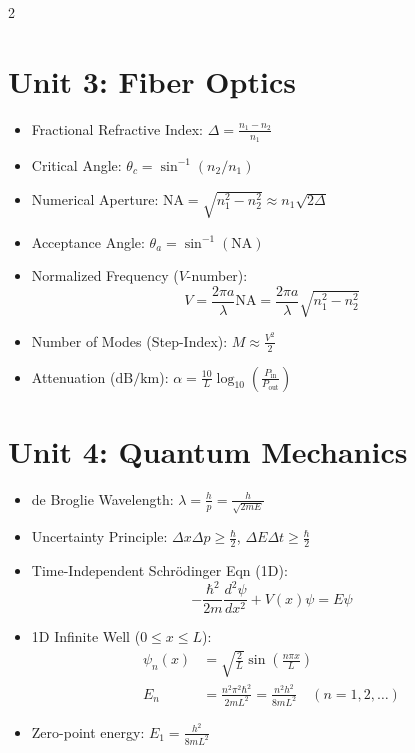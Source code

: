 \begin{multicols}{2}
{\columnbreak

\section*{Unit 3: Fiber Optics}
\begin{itemize}[leftmargin=*]
    \item Fractional Refractive Index: $\Delta = \frac{n_1 - n_2}{n_1}$
    \item Critical Angle: $\theta_c = \sin^{-1}(n_2 / n_1)$
    \item Numerical Aperture: $\text{NA} = \sqrt{n_1^2 - n_2^2} \approx n_1 \sqrt{2\Delta}$
    \item Acceptance Angle: $\theta_a = \sin^{-1}(\text{NA})$
    \item Normalized Frequency ($V$-number):
    \[
    V = \frac{2\pi a}{\lambda}\text{NA} = \frac{2\pi a}{\lambda}\sqrt{n_1^2 - n_2^2}
    \]
    \item Number of Modes (Step-Index): $M \approx \frac{V^2}{2}$
    \item Attenuation ($\si{\deci\bel\per\kilo\meter}$): $\alpha = \frac{10}{L}\log_{10}\left(\frac{P_{\text{in}}}{P_{\text{out}}}\right)$
\end{itemize}

\section*{Unit 4: Quantum Mechanics}
\begin{itemize}[leftmargin=*]
    \item de Broglie Wavelength: $\lambda = \frac{h}{p} = \frac{h}{\sqrt{2mE}}$
    \item Uncertainty Principle: $\Delta x \Delta p \ge \frac{\hbar}{2}$, $\Delta E \Delta t \ge \frac{\hbar}{2}$
    \item Time-Independent Schrödinger Eqn (1D):
    \[
    -\frac{\hbar^2}{2m}\frac{d^2\psi}{dx^2} + V(x)\psi = E\psi
    \]
    \item 1D Infinite Well ($0 \le x \le L$):
    \begin{align*}
    \psi_n(x) &= \sqrt{\frac{2}{L}}\sin\left(\frac{n\pi x}{L}\right) \\
    E_n &= \frac{n^2 \pi^2 \hbar^2}{2m L^2} = \frac{n^2 h^2}{8m L^2} \quad (n=1,2,\dots)
    \end{align*}
    \item Zero-point energy: $E_1 = \frac{h^2}{8mL^2}$
\end{itemize}

}
\end{multicols}
